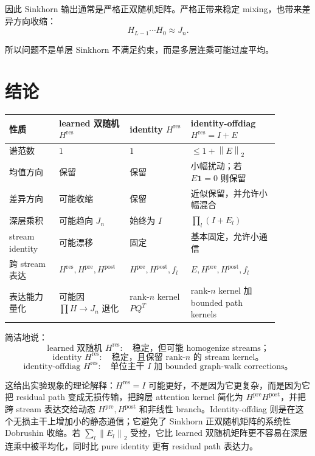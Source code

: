 \documentclass[UTF8,11pt]{ctexart}
\newcommand{\one}{\mathbf{1}}
\newcommand{\J}{J_n}
\newcommand{\Hres}{H^{\mathrm{res}}}
\newcommand{\Hpre}{H^{\mathrm{pre}}}
\newcommand{\Hpost}{H^{\mathrm{post}}}
\newcommand{\norm}[1]{\left\lVert #1 \right\rVert}
\begin{document}
因此 Sinkhorn 输出通常是严格正双随机矩阵。严格正带来稳定 mixing，也带来差异方向收缩：
\begin{equation}
  H_{L-1}\cdots H_0
  \approx
  \J.
\end{equation}

所以问题不是单层 Sinkhorn 不满足约束，而是多层连乘可能过度平均。

\section{结论}

\begin{center}
\small
\begin{tabular}{p{0.17\linewidth}p{0.23\linewidth}p{0.18\linewidth}p{0.30\linewidth}}
\toprule
性质 & learned 双随机 $\Hres$ & identity $\Hres$ & identity-offdiag $\Hres=I+E$ \\
\midrule
谱范数 & $1$ & $1$ & $\le 1+\norm{E}_2$ \\
均值方向 & 保留 & 保留 & 小幅扰动；若 $E\one=0$ 则保留 \\
差异方向 & 可能收缩 & 保留 & 近似保留，并允许小幅混合 \\
深层乘积 & 可能趋向 $\J$ & 始终为 $I$ & $\prod_l(I+E_l)$ \\
stream identity & 可能漂移 & 固定 & 基本固定，允许小通信 \\
跨 stream 表达 & $\Hres,\Hpre,\Hpost$ & $\Hpre,\Hpost,f_l$ & $E,\Hpre,\Hpost,f_l$ \\
表达能力量化 & 可能因 $\prod H\to\J$ 退化 & rank-$n$ kernel $PQ^T$ & rank-$n$ kernel 加 bounded path kernels \\
\bottomrule
\end{tabular}
\end{center}

简洁地说：
\begin{equation}
  \text{learned 双随机 }\Hres:
  \quad
  \text{稳定，但可能 homogenize streams；}
\end{equation}
\begin{equation}
  \text{identity }\Hres:
  \quad
  \text{稳定，且保留 rank-}n\text{ 的 stream kernel。}
\end{equation}
\begin{equation}
  \text{identity-offdiag }\Hres:
  \quad
  \text{单位主干 } I \text{ 加 bounded graph-walk corrections。}
\end{equation}

这给出实验现象的理论解释：$\Hres=I$ 可能更好，不是因为它更复杂，而是因为它把 residual path 变成无损传输，把跨层 attention kernel 简化为 $H^{\mathrm{pre}}H^{\mathrm{post}}$，并把跨 stream 表达交给动态 $\Hpre,\Hpost$ 和非线性 branch。Identity-offdiag 则是在这个无损主干上增加小的静态通信；它避免了 Sinkhorn 正双随机矩阵的系统性 Dobrushin 收缩。若 $\sum_l\norm{E_l}_2$ 受控，它比 learned 双随机矩阵更不容易在深层连乘中被平均化，同时比 pure identity 更有 residual path 表达力。
\end{document}
